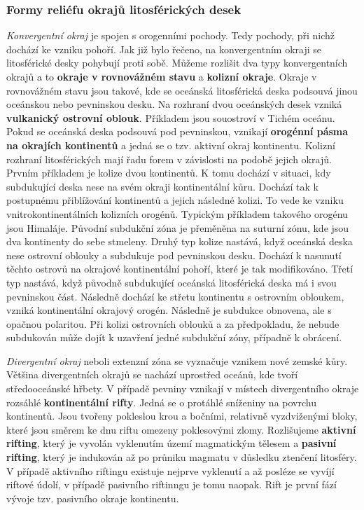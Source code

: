 \subsubsection{Formy reliéfu okrajů litosférických desek}
\emph{Konvergentní okraj} je spojen s orogenními pochody. Tedy pochody, při nichž dochází ke vzniku pohoří. Jak již bylo řečeno, na konvergentním okraji se litosférické desky pohybují proti sobě. Můžeme rozlišit dva typy konvergentních okrajů a to \textbf{okraje v rovnovážném stavu} a \textbf{kolizní okraje}. Okraje v rovnovážném stavu jsou takové, kde se oceánská litosférická deska podsouvá jinou oceánskou nebo pevninskou desku. Na rozhraní dvou oceánských desek vzniká \textbf{vulkanický ostrovní oblouk}. Příkladem jsou souostroví v Tichém oceánu. Pokud se oceánská deska podsouvá pod pevninskou, vznikají \textbf{orogénní pásma na okrajích kontinentů} a jedná se o tzv. aktivní okraj kontinentu. Kolizní rozhraní litosférických mají řadu forem v závislosti na podobě jejich okrajů. Prvním příkladem je kolize dvou kontinentů. K tomu dochází v situaci, kdy subdukující deska nese na svém okraji kontinentální kůru. Dochází tak k postupnému přiblížování kontinentů a jejich následné kolizi. To vede ke vzniku vnitrokontinentálních kolizních orogénů. Typickým příkladem takového orogénu jsou Himaláje. Původní subdukční zóna je přeměněna na suturní zónu, kde jsou dva kontinenty do sebe stmeleny. Druhý typ kolize nastává, když oceánská deska nese ostrovní oblouky a subdukuje pod pevninskou desku. Dochází k nasunutí těchto ostrovů na okrajové kontinentální pohoří, které je tak modifikováno. Třetí typ nastává, když původně subdukující oceánská litosférická deska má i svou pevninskou část. Následně dochází ke střetu kontinentu s ostrovním obloukem, vzniká kontinentální okrajový orogén. Následně je subdukce obnovena, ale s opačnou polaritou. Při kolizi ostrovních oblouků a za předpokladu, že nebude subdukován může dojít k uzavření jedné subdukční zóny, případně k obrácení.

\emph{Divergentní okraj} neboli extenzní zóna se vyznačuje vznikem nové zemské kůry. Většina divergentních okrajů se nachází uprostřed oceánů, kde tvoří středooceánské hřbety. V případě pevniny vznikají v místech divergentního okraje rozsáhlé \textbf{kontinentální rifty}. Jedná se o protáhlé sníženiny na povrchu kontinentů. Jsou tvořeny pokleslou krou a bočními, relativně vyzdviženými bloky, které jsou směrem ke dnu riftu omezeny poklesovými zlomy. Rozlišujeme \textbf{aktivní rifting}, který je vyvolán vyklenutím území magmatickým tělesem a \textbf{pasivní rifting}, který je indukován až po průniku magmatu v důsledku ztenčení litosféry. V případě aktivního riftingu existuje nejprve vyklenutí a až posléze se vyvíjí riftové údolí, v případě pasivního riftinngu je tomu naopak. Rift je první fází vývoje tzv. pasivního okraje kontinentu.

